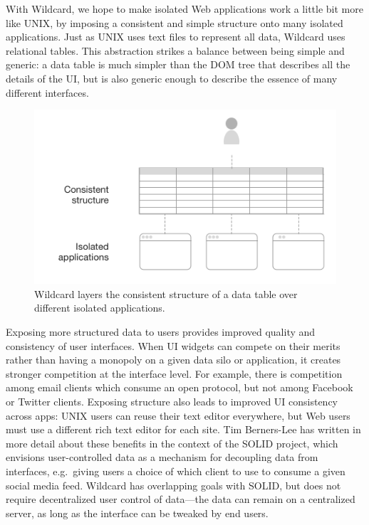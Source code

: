 \documentclass[english,submission]{programming}
\begin{document}
With Wildcard, we hope to make isolated Web applications work a little
bit more like UNIX, by imposing a consistent and simple structure onto
many isolated applications. Just as UNIX uses text files to represent
all data, Wildcard uses relational tables. This abstraction strikes a
balance between being simple and generic: a data table is much simpler
than the DOM tree that describes all the details of the UI, but is also
generic enough to describe the essence of many different interfaces.

\begin{figure}
\centering
\includegraphics{media/structure.png}
\caption{Wildcard layers the consistent structure of a data table over
different isolated applications.}
\end{figure}

Exposing more structured data to users provides improved quality and
consistency of user interfaces. When UI widgets can compete on their
merits rather than having a monopoly on a given data silo or
application, it creates stronger competition at the interface level. For
example, there is competition among email clients which consume an open
protocol, but not among Facebook or Twitter clients. Exposing structure
also leads to improved UI consistency across apps: UNIX users can reuse
their text editor everywhere, but Web users must use a different rich
text editor for each site. Tim Berners-Lee has written in more detail
about these benefits \autocite{berners-lee2018} in the context of the
SOLID project, which envisions user-controlled data as a mechanism for
decoupling data from interfaces, e.g.~giving users a choice of which
client to use to consume a given social media feed. Wildcard has
overlapping goals with SOLID, but does not require decentralized user
control of data---the data can remain on a centralized server, as long
as the interface can be tweaked by end users.
\end{document}
